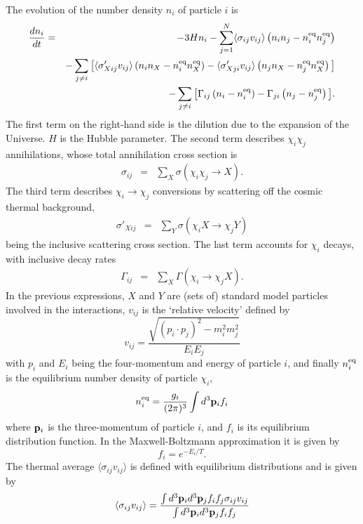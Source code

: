 \documentclass[a4paper,10pt,oneside]{book}
\begin{document}
The evolution of the number density $n_i$ of particle $i$ is
\begin{eqnarray} \label{eq:Boltzmann}
  \frac{dn_{i}}{dt} 
  &=& 
  -3 H n_{i} 
  - \sum_{j=1}^N \langle \sigma_{ij} v_{ij} \rangle 
    \left( n_{i} n_{j} - n_{i}^{\rm{eq}} n_{j}^{\rm{eq}} \right) 
  \nonumber \\ 
  & & 
  - \sum_{j\ne i} 
  \big[ \langle \sigma'_{Xij} v_{ij} \rangle 
        \left( n_i n_X - n_{i}^{\rm{eq}} n_{X}^{\rm{eq}} \right)
      - \langle \sigma'_{Xji} v_{ij} \rangle
        \left( n_j n_X - n_{j}^{\rm{eq}} n_{X}^{\rm{eq}} \right)
  \big]
  \nonumber \\ 
  & &
  - \sum_{j\ne i} 
  \big[ \Gamma_{ij} 
        \left( n_i - n_i^{\rm{eq}} \right) 
      - \Gamma_{ji} 
        \left( n_j - n_j^{\rm{eq}} \right) 
  \big] .
\end{eqnarray}
The first term on the right-hand side is the dilution due to the
expansion of the Universe. $H$ is the Hubble parameter. The second
term describes $\chi_i\chi_j$ annihilations, whose total
annihilation cross section is 
\begin{eqnarray}
  \sigma_{ij}  & = & \sum_X \sigma (\chi_i \chi_j \rightarrow X).
\end{eqnarray}
The third term describes $\chi_i \to \chi_j$ conversions by
scattering off the cosmic thermal background,
\begin{eqnarray}
  \sigma'_{Xij} & = & \sum_Y \sigma (\chi_i X \rightarrow \chi_j Y)
\end{eqnarray}
being the inclusive scattering cross section. The last term accounts
for $\chi_i$ decays, with inclusive decay rates 
\begin{eqnarray}
  \Gamma_{ij}  & = & \sum_X \Gamma (\chi_i \rightarrow \chi_j X).
\end{eqnarray}
In the previous expressions, $X$ and $Y$
are (sets of) standard model particles involved in the
interactions, $v_{ij}$ is the `relative velocity' defined by
\begin{equation}
  v_{ij} = \frac{\sqrt{(p_{i} \cdot p_{j})^2-m_{i}^2 m_{j}^2}}{E_{i} E_{j}}
\end{equation}
with $p_{i}$ and $E_{i}$ being the four-momentum and energy of 
particle $i$, and finally $n_{i}^{\rm{eq}}$ is the equilibrium number
density of particle $\chi_i$,
\begin{equation}
  n_{i}^{\rm{eq}} = \frac{g_{i}}{(2\pi)^3} \int d^3{\bf p}_{i}f_{i}
\end{equation}
where ${\bf p}_i$ is the three-momentum of particle $i$, and
 $f_i$ is its equilibrium distribution function. 
In the Maxwell-Boltzmann approximation it is given by
\begin{equation}
  f_{i} = e^{-E_{i}/T}.
\end{equation}
The thermal average $\langle\sigma_{ij}v_{ij}\rangle$ is defined
with equilibrium distributions and is given by
\begin{equation}
  \langle \sigma_{ij}v_{ij} \rangle = \frac{\int d^3{\bf
      p}_{i}d^3{\bf p}_{j} 
  f_{i}f_{j}\sigma_{ij}v_{ij}}
  {\int d^3{\bf p}_{i}d^3{\bf p}_{j}f_{i}f_{j}}
\end{equation}
\end{document}
